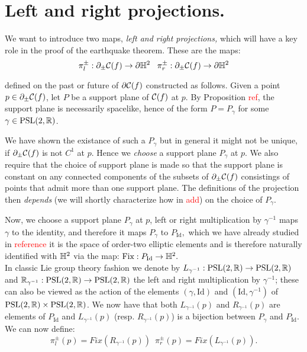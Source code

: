 \section{Left and right projections.} We want to introduce two maps, \textit{left and right projections,} which will have a key role in the proof of the earthquake theorem. These are the maps: 
\[
    \pi_l^\pm:\partial_\pm\mathcal{C}(f)\to\partial\mathbb{H}^2 \;\;\; \pi_r^\pm:\partial_\pm\mathcal{C}(f)\to\partial\mathbb{H}^2
\] 

defined on the past or future of $\partial\mathcal{C}(f)$ constructed as follows. Given a point $p\in\partial_\pm\mathcal{C}(f)$, let $P$ be a support plane of $\mathcal{C}(f)$ at $p$. By Proposition \textcolor{red}{ref}, the support plane is necessarily spacelike, hence of the form $P=P_\gamma$ for some $\gamma\in\text{PSL}(2,\mathbb{R})$.

\begin{observation}
We have shown the existance of such a $P_\gamma$ but in general it might not be unique, if $\partial_{\pm}\mathcal{C}(f)$ is not $C^1$ at $p.$ Hence we \textit{choose} a support plane $P_\gamma$ at $p$. We also require that the choice of support plane is made so that the support plane is constant on any connected components of the subsets of $\partial_\pm\mathcal{C}(f)$ consistings of points that admit more than one support plane. The definitions of the projection then \textit{depends} (we will shortly characterize how in \textcolor{red}{add}) on the choice of $P_\gamma$.
\end{observation}

Now, we choose a support plane $P_\gamma$ at $p$, left or right multiplication by $\gamma^{-1}$ maps $\gamma$ to the identity, and therefore it maps $P_\gamma$ to $P_{\text{Id}},$ which we have already studied in \textcolor{red}{reference} it is the space of order-two elliptic elements and is therefore naturally identified with $\mathbb{H}^2$ via the map: $\text{Fix}:P_{\text{Id}}\to\mathbb{H}^2.$ \\
In classic Lie group theory fashion we denote by $L_{\gamma^{-1}}:\text{PSL}(2,\mathbb{R})\to\text{PSL}(2,\mathbb{R})$ and $\mathbb{R}_{\gamma^{-1}}:\text{PSL}(2,\mathbb{R})\to\text{PSL}(2,\mathbb{R})$ the left and right multiplication by $\gamma^{-1}$; these can also be viewed as the action of the elements $(\gamma,\text{Id})$ and $(\text{Id},\gamma^{-1})$ of $\text{PSL}(2,\mathbb{R})\times\text{PSL}(2,\mathbb{R})$. We now have that both $L_{\gamma^{-1}}(p)$ and $R_{\gamma^{-1}}(p)$ are elements of $P_{\text{Id}}$ and $L_{\gamma^{-1}}(p)$ (resp. $R_{\gamma^{-1}}(p)$) is a bijection between $P_\gamma$ and $P_\text{Id}.$ We can now define: 
\begin{equation}\label{defproj}
    \pi_l^\pm(p)=Fix(R_{\gamma^{-1}}(p))\;\ \pi_r^\pm(p)=Fix(L_{\gamma^{-1}}(p)).
\end{equation}
    


